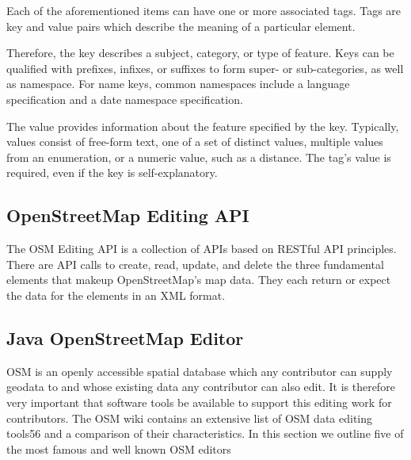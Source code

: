 Each of the aforementioned items can have one or more associated tags. Tags are key and value pairs which describe the meaning of a particular element. 

Therefore, the key describes a subject, category, or type of feature.
Keys can be qualified with prefixes, infixes, or suffixes to form super- or sub-categories, as well as namespace. For name keys, common namespaces include a language specification and a date namespace specification.

The value provides information about the feature specified by the key.
Typically, values consist of free-form text, one of a set of distinct values, multiple values from an enumeration, or a numeric value, such as a distance.
The tag's value is required, even if the key is self-explanatory. 








\subsection{OpenStreetMap Editing API}

The OSM Editing API is a collection of APIs based on RESTful API principles. There are API calls to create, read, update, and delete the three fundamental elements that makeup OpenStreetMap's map data. They each return or expect the data for the elements in an XML format.
\autocite[]{wiki:api}


\subsection{Java OpenStreetMap Editor}

OSM is an openly accessible spatial database which any contributor can supply geodata to and whose existing data any contributor can also edit. It is therefore very important that software tools be available to support this editing work for contributors. The OSM wiki contains an extensive list of OSM data editing tools56
and a comparison of their characteristics. In this section we outline five of the most famous and well known OSM editors

